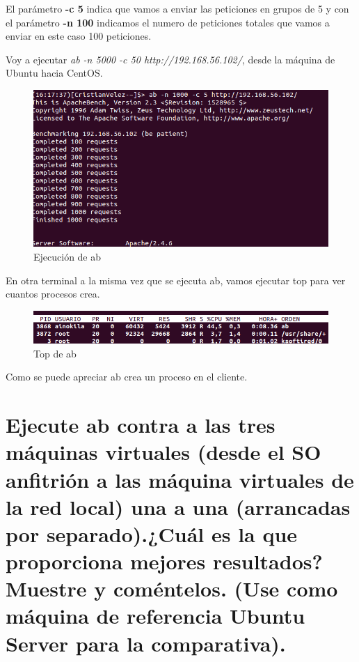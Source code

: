 El parámetro \textbf{-c 5} indica que vamos a enviar las peticiones en grupos de 5 y con el parámetro \textbf{-n 100} indicamos el numero de peticiones totales que vamos a enviar en este caso 100 peticiones.

Voy a ejecutar \textit{ab -n 5000 -c 50 http://192.168.56.102/}, desde la máquina de Ubuntu hacia CentOS.

\begin{figure}[H] %
	\centering
	\includegraphics[scale=0.3]{pics/ab1}
	\caption{Ejecución de ab} \label{fig:ab1}
\end{figure}

En otra terminal a la misma vez que se ejecuta ab, vamos ejecutar top para ver cuantos procesos crea.

\begin{figure}[H] %
	\centering
	\includegraphics[scale=0.3]{pics/ab0}
	\caption{Top de ab} \label{fig:ab0}
\end{figure}

Como se puede apreciar ab crea un proceso en el cliente.





\section[Cuestión 3]{Ejecute ab contra a las tres máquinas virtuales (desde el SO	anfitrión a las máquina virtuales de la red local) una a una (arrancadas por	separado).¿Cuál es la que proporciona mejores resultados? Muestre y coméntelos. (Use como máquina de referencia Ubuntu Server para la comparativa).}

